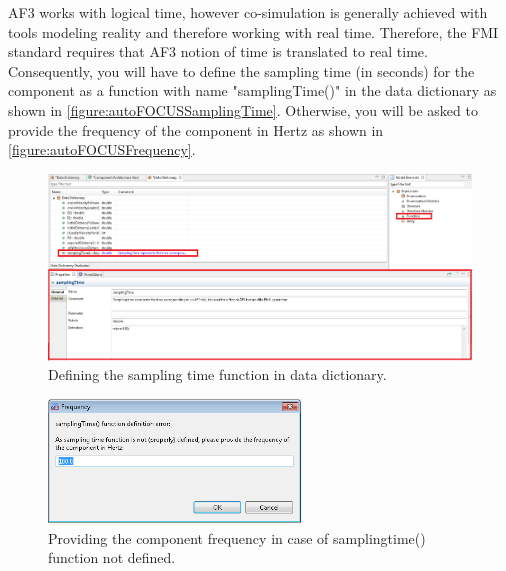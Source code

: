AF3 works with logical time, however co-simulation is generally achieved with tools modeling reality and therefore working with real time. Therefore, the FMI standard requires that AF3 notion of time is translated to real time. Consequently, you will have to define the sampling time (in seconds) for the component as a function with name "samplingTime()" in the data dictionary as shown in \autoref{figure:autoFOCUSSamplingTime}. Otherwise, you will be asked to provide the frequency of the component in Hertz as shown in  \autoref{figure:autoFOCUSFrequency}.

\begin{figure}[ht]
	\centerline{\includegraphics[width=1\textwidth]{figures/autoFOCUSSamplingTime.png}}
	\caption{Defining the sampling time function in data dictionary.}
	\label{figure:autoFOCUSSamplingTime}
\end{figure}

\begin{figure}[ht]
	\centerline{\includegraphics[width=0.6\textwidth]{figures/autoFOCUSFrequency.png}}
	\caption{Providing the component frequency in case of samplingtime() function not defined.}
	\label{figure:autoFOCUSFrequency}
\end{figure}


